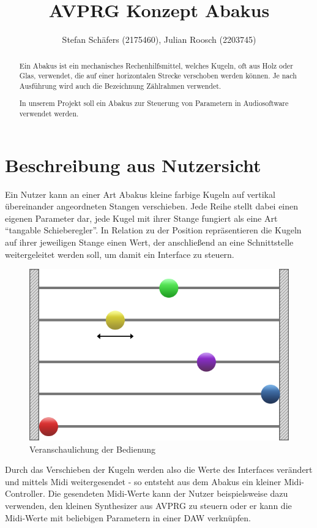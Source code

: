 \documentclass[12pt]{article}
\title{AVPRG Konzept \glqq Abakus\grqq}
\author{Stefan Schäfers (2175460), Julian Roosch (2203745)}
\begin{document}
\maketitle
\begin{abstract}
Ein Abakus ist ein mechanisches Rechenhilfsmittel, welches Kugeln, oft aus Holz oder Glas, verwendet, die auf einer horizontalen Strecke verschoben werden können. Je nach Ausführung wird auch die Bezeichnung Zählrahmen verwendet.

In unserem Projekt soll ein Abakus zur Steuerung von Parametern in Audiosoftware verwendet werden.

\end{abstract}
\section{Beschreibung aus Nutzersicht}
Ein Nutzer kann an einer Art Abakus kleine farbige Kugeln auf vertikal übereinander angeordneten Stangen verschieben. Jede Reihe stellt dabei einen eigenen Parameter dar, jede Kugel mit ihrer Stange fungiert als eine Art “tangable Schieberegler”. In Relation zu der Position repräsentieren die Kugeln auf ihrer jeweiligen Stange einen Wert, der anschließend an eine Schnittstelle weitergeleitet werden soll, um damit ein Interface zu steuern. \begin{figure}[H]
\begin{center}
\includegraphics[width=0.6\linewidth]{AbakusSK_Farbe.png}
\caption{Veranschaulichung der Bedienung}
\end{center}
\end{figure}Durch das Verschieben der Kugeln werden also die Werte des Interfaces verändert und mittels Midi weitergesendet - so entsteht aus dem Abakus ein kleiner Midi-Controller. Die gesendeten Midi-Werte kann der Nutzer beispielsweise dazu verwenden, den kleinen Synthesizer aus AVPRG zu steuern oder er kann die Midi-Werte mit beliebigen Parametern in einer DAW verknüpfen.
\end{document}
